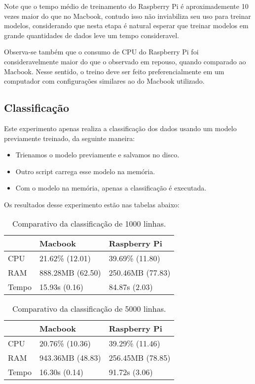 Note que o tempo médio de treinamento do Raspberry Pi é aproximademente 10 vezes maior do que no Macbook,
contudo isso não inviabiliza seu uso para treinar modelos, considerando que nesta etapa é natural
esperar que treinar modelos em grande quantidades de dados leve um tempo consideravel.

Observa-se também que o consumo de CPU do Raspberry Pi foi consideravelmente maior do que o observado 
em repouso, quando comparado ao Macbook. Nesse sentido, o treino deve ser feito preferencialmente 
em um computador com configurações similares ao do Macbook utilizado.


\subsection{Classificação}

Este experimento apenas realiza a classificação dos dados usando um modelo previamente treinado, 
da seguinte maneira:

\begin{itemize}
    \item Trienamos o modelo previamente e salvamos no disco.
    \item Outro script carrega esse modelo na memória. 
    \item Com o modelo na memória, apenas a classificação é executada.
\end{itemize}


Os resultados desse experimento estão nas tabelas abaixo:


\begin{table}[!ht]
    \centering
    \begin{tabular}{|l|l|l|}
    \hline
        ~ & Macbook & Raspberry Pi \\ \hline
        CPU & 21.62\% (12.01) & 39.69\% (11.80) \\ \hline
        RAM & 888.28MB (62.50) & 250.46MB (77.83) \\ \hline
        Tempo & 15.93s (0.16) & 84.87s (2.03) \\ \hline
    \end{tabular}

    \caption{Comparativo da classificação de 1000 linhas.\label{tab:comparativo_classificacao_1000}}
\end{table}


\begin{table}[!ht]
    \centering
    \begin{tabular}{|l|l|l|}
    \hline
        ~ & Macbook & Raspberry Pi \\ \hline
        CPU & 20.76\% (10.36) & 39.29\% (11.46) \\ \hline
        RAM & 943.36MB (48.83) & 256.45MB (78.85) \\ \hline
        Tempo & 16.30s (0.14) & 91.72s (3.06) \\ \hline
    \end{tabular}

    \caption{Comparativo da classificação de 5000 linhas.\label{tab:comparativo_classificacao_5000}}
\end{table}


